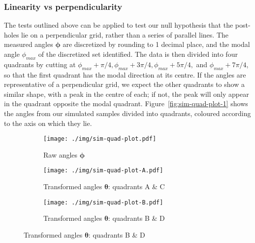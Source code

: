 \documentclass[../../ArchStats.tex]{subfiles}
\begin{document}
\subsubsection{Linearity vs perpendicularity}

The tests outlined above can be applied to test our null hypothesis that the post-holes lie on a perpendicular grid, rather than a series of parallel lines. The measured angles $\boldsymbol{\phi}$ are discretized by rounding to 1 decimal place, and the modal angle $\phi_{max}$ of the discretized set identified. The data is then divided into four quadrants by cutting at $\phi_{max} + \pi/4, \phi_{max} + 3\pi/4, \phi_{max} + 5\pi/4,$ and $\phi_{max} + 7\pi/4$, so that the first quadrant has the modal direction at its centre. If the angles are representative of a perpendicular grid, we expect the other quadrants to show a similar shape, with a peak in the centre of each; if not, the peak will only appear in the quadrant opposite the modal quadrant. Figure~\ref{fig:sim-quad-plot-1} shows the angles from our simulated samples divided into quadrants, coloured according to the axis on which they lie.

\begin{figure}[!h]
\centering
\caption{Data divided into two pairs of opposing quadrants, representing the axes of the grid }
\label{fig:sim-quad-plot-1}
\begin{subfigure}[t]{0.3\textwidth}
\caption{Raw angles $\boldsymbol{\phi}$}
\texttt{[image: ./img/sim-quad-plot.pdf]}
\end{subfigure}
\begin{subfigure}[t]{0.3\textwidth}
\caption{Transformed angles $\boldsymbol{\theta}$: quadrants A \& C}
\texttt{[image: ./img/sim-quad-plot-A.pdf]}
\end{subfigure}
\begin{subfigure}[t]{0.3\textwidth}
\caption{Transformed angles $\boldsymbol{\theta}$: quadrants B \& D}
\texttt{[image: ./img/sim-quad-plot-B.pdf]}
\end{subfigure}
\end{figure}
\end{document}
